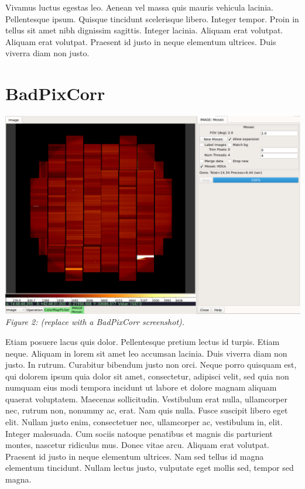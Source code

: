 \documentclass[]{article}
\begin{document}
\begin{multicols}{3}
\para
Vivamus luctus egestas leo. Aenean vel massa quis mauris vehicula
lacinia. Pellentesque ipsum. Quisque tincidunt scelerisque
libero. Integer tempor. Proin in tellus sit amet nibh dignissim
sagittis. Integer lacinia. Aliquam erat volutpat. Aliquam erat
volutpat. Praesent id justo in neque elementum ultrices. Duis viverra
diam non justo. 

\section*{BadPixCorr}

\para
\begin{center}
\includegraphics[width=8in]{plugin_mosaic.png}
\label{fig:ref_viewer}
\vspace*{0.4em}
{\small\em Figure 2: (replace with a BadPixCorr screenshot).} 
\end{center}

\para
Etiam posuere lacus quis dolor. Pellentesque pretium lectus id
turpis. Etiam neque. Aliquam in lorem sit amet leo accumsan
lacinia. Duis viverra diam non justo. In rutrum. Curabitur bibendum
justo non orci. Neque porro quisquam est, qui dolorem ipsum quia dolor
sit amet, consectetur, adipisci velit, sed quia non numquam eius modi
tempora incidunt ut labore et dolore magnam aliquam quaerat
voluptatem. Maecenas sollicitudin. Vestibulum erat nulla, ullamcorper
nec, rutrum non, nonummy ac, erat. Nam quis nulla. Fusce suscipit libero
eget elit. Nullam justo enim, consectetuer nec, ullamcorper ac,
vestibulum in, elit. Integer malesuada. Cum sociis natoque penatibus et
magnis dis parturient montes, nascetur ridiculus mus. Donec vitae
arcu. Aliquam erat volutpat. Praesent id justo in neque elementum
ultrices. Nam sed tellus id magna elementum tincidunt. Nullam lectus
justo, vulputate eget mollis sed, tempor sed magna. 


\end{multicols}
\end{document}
